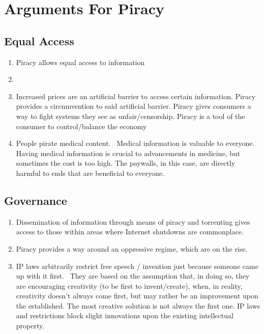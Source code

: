\documentclass[onecolumn, 12pt]{article}
\begin{document}
\section{Arguments For Piracy}

\subsection{Equal Access}

\begin{enumerate}
  \item Piracy allows equal access to information
  \item {}

  \item Increased prices are an artificial barrier to access certain
    information. Piracy provides a circumvention to said artificial barrier.
    Piracy gives consumers a way to fight systems they see as
    unfair/censorship. Piracy is a tool of the consumer to control/balance the
    economy~\cite{darnton:pirating-and-publishing, bohannon:everyone}

  \item People pirate medical content.~\cite{till:medical-literature}
    Medical information is valuable to everyone. Having medical information is
    crucial to advancements in medicine, but sometimes the cost is too high.
    The paywalls, in this case, are directly harmful to ends that are
    beneficial to everyone.
\end{enumerate}

\subsection{Governance}

\begin{enumerate}
  \item Dissemination of information through means of piracy and torrenting
    gives access to those within areas where Internet shutdowns are commonplace.

  \item Piracy provides a way around an oppressive regime, which are on the
    rise.~\cite{current:jigsaw}

  \item IP laws arbitrarily restrict free speech / invention just because
    someone came up with it first.~\cite[1339]{lemley:faith-based} They are
    based on the assumption that, in doing so, they are encouraging creativity
    (to be first to invent/create), when, in reality, creativity doesn't always
    come first, but may rather be an improvement upon the established. The most
    creative solution is not always the first one. IP laws and restrictions
    block slight innovations upon the existing intellectual property.
\end{enumerate}
\end{document}
